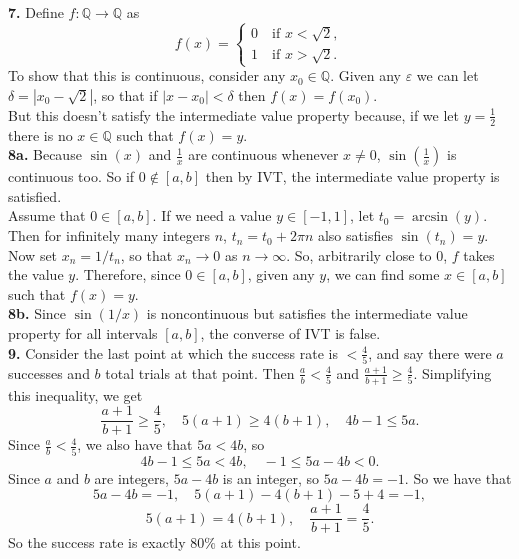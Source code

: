 \documentclass{article}
\newcommand{\Q}{\mathbb{Q}}
\newcommand{\eps}{\varepsilon}
\begin{document}
\textbf{7.} Define $f: \Q \to \Q$ as
$$f(x) = \begin{cases}
    0 \quad \text{if } x < \sqrt{2}, \\
    1 \quad \text{if } x > \sqrt{2}.
\end{cases}$$
To show that this is continuous, consider any $x_0 \in \Q$. Given any $\eps$ we can let $\delta = |x_0 - \sqrt{2}|$, so that if $|x - x_0| < \delta$ then $f(x) = f(x_0)$. \\

But this doesn't satisfy the intermediate value property because, if we let $y = \frac{1}{2}$ there is no $x \in \Q$ such that $f(x) = y$. \\

\textbf{8a.} Because $\sin(x)$ and $\frac{1}{x}$ are continuous whenever $x \neq 0$, $\sin\left(\frac{1}{x}\right)$ is continuous too. So if $0 \notin [a, b]$ then by IVT, the intermediate value property is satisfied. \\

Assume that $0 \in [a, b]$. If we need a value $y \in [-1, 1]$, let $t_0 = \arcsin(y)$. Then for infinitely many integers $n$, $t_n = t_0 + 2\pi n$ also satisfies $\sin(t_n) = y$. Now set $x_n = 1/t_n$, so that $x_n \to 0$ as $n \to \infty$. So, arbitrarily close to $0$, $f$ takes the value $y$. Therefore, since $0 \in [a, b]$, given any $y$, we can find some $x \in [a, b]$ such that $f(x) = y$. \\

\textbf{8b.} Since $\sin(1/x)$ is noncontinuous but satisfies the intermediate value property for all intervals $[a, b]$, the converse of IVT is false. \\

\textbf{9.} Consider the last point at which the success rate is $< \frac{4}{5}$, and say there were $a$ successes and $b$ total trials at that point. Then $\frac{a}{b} < \frac{4}{5}$ and $\frac{a + 1}{b + 1} \ge \frac{4}{5}$. Simplifying this inequality, we get
$$\frac{a + 1}{b + 1} \ge \frac{4}{5}, \quad 5(a + 1) \ge 4(b + 1), \quad 4b - 1 \le 5a.$$
Since $\frac{a}{b} < \frac{4}{5}$, we also have that $5a < 4b$, so
$$4b - 1 \le 5a < 4b, \quad -1 \le 5a - 4b < 0.$$
Since $a$ and $b$ are integers, $5a - 4b$ is an integer, so $5a - 4b = -1$. So we have that
$$5a - 4b = -1, \quad 5(a + 1) - 4(b + 1) - 5 + 4 = -1,$$
$$5(a + 1) = 4(b + 1), \quad \frac{a + 1}{b + 1} = \frac{4}{5}.$$
So the success rate is exactly $80\%$ at this point.
\end{document}
